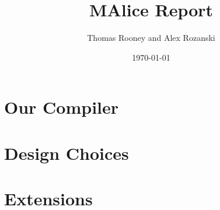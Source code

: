 \documentclass[a4wide, 11pt]{article}
\begin{document}
\title{MAlice Report}

\author{Thomas Rooney and Alex Rozanski}

\date{\today}

\maketitle

\section{Our Compiler}

\section{Design Choices}

\section{Extensions}
\end{document}
